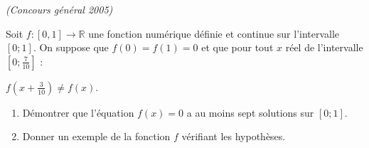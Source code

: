 
%
\textit{(Concours général 2005)}
\par
Soit $f : \left[0,1\right] \rightarrow  \mathbb{R}$ une fonction numérique définie et continue sur l'intervalle $\left[0 ; 1\right]$. On suppose que $f\left(0\right)=f\left(1\right)=0$ et que pour tout $x$ réel de l'intervalle $\left[0 ; \frac{7}{10}\right]$ :
\begin{center}$f \left(x+\frac{3}{10}\right) \neq  f\left(x\right)$.\end{center}
\begin{enumerate}
     \item
     Démontrer que l'équation $f\left(x\right)=0$ a au moins sept solutions sur $\left[0 ; 1\right]$.
     \item
     Donner un exemple de la fonction $f$ vérifiant les hypothèses.
\end{enumerate}
\begin{corrige}
\end{corrige}


